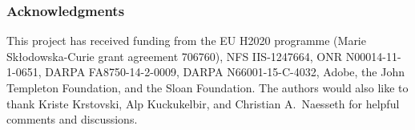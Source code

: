 \documentclass{article}
\begin{document}
\setlength{\textfloatsep}{7pt}









\vspace*{-7pt}
\subsubsection*{Acknowledgments}
\vspace*{-5pt}
This project has received funding from the EU H2020 programme (Marie Sk\l{}odowska-Curie grant agreement 706760), NFS IIS-1247664, ONR N00014-11-1-0651, DARPA FA8750-14-2-0009, DARPA N66001-15-C-4032, Adobe, the John Templeton Foundation, and the Sloan Foundation. The authors would also like to thank Kriste Krstovski, Alp Kuckukelbir, and Christian A.\ Naesseth for helpful comments and discussions.


\vspace*{-10pt}
\small


%
\end{document}
